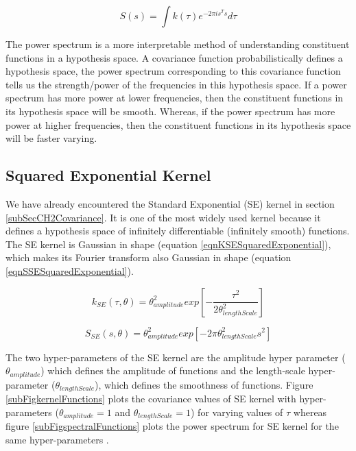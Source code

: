 \begin{equation}\label{eqCh4StationaryPowerSpectrum}
    S(s) = \int k(\tau) e^{-2 \pi is^{T} s}d\tau 
\end{equation}

The power spectrum is a more interpretable method of understanding constituent functions in a hypothesis space. A covariance function probabilistically defines a hypothesis space, the power spectrum corresponding to this covariance function tells us the strength/power of the frequencies in this hypothesis space. If a power spectrum has more power at lower frequencies, then the constituent functions in its hypothesis space will be smooth. Whereas, if the power spectrum has more power at higher frequencies, then the constituent functions in its hypothesis space will be faster varying. 

\subsection{Squared Exponential Kernel}\label{subSecCh4SEKernel}
We have already encountered the Standard Exponential (SE) kernel in section \ref{subSecCH2Covariance}. It is one of the most widely used kernel because it defines a hypothesis space of infinitely differentiable (infinitely smooth) functions. The SE kernel is Gaussian in shape (equation \ref{eqnKSESquaredExponential}), which makes its Fourier transform also Gaussian in shape (equation \ref{eqnSSESquaredExponential}).  

\begin{equation}\label{eqnKSESquaredExponential}
k_{SE}(\tau, \theta) = \theta_{amplitude}^2exp[-\frac{\tau^2}{2\theta_{lengthScale}^2}]
\end{equation}

\begin{equation}\label{eqnSSESquaredExponential}
S_{SE}(s, \theta) = \theta_{amplitude}^2  exp[-2\pi \theta_{lengthScale}^2 s^2]
\end{equation}

The two hyper-parameters of the SE kernel are the amplitude hyper parameter ($\theta_{amplitude}$) which defines the amplitude of functions and the length-scale hyper-parameter ($\theta_{lengthScale}$), which defines the smoothness of functions. Figure \ref{subFigkernelFunctions} plots the covariance values of SE kernel with hyper-parameters ($\theta_{amplitude}=1$ and $\theta_{lengthScale}=1$) for varying values of $\tau$ whereas figure \ref{subFigspectralFunctions} plots the power spectrum for SE kernel for the same hyper-parameters . 

